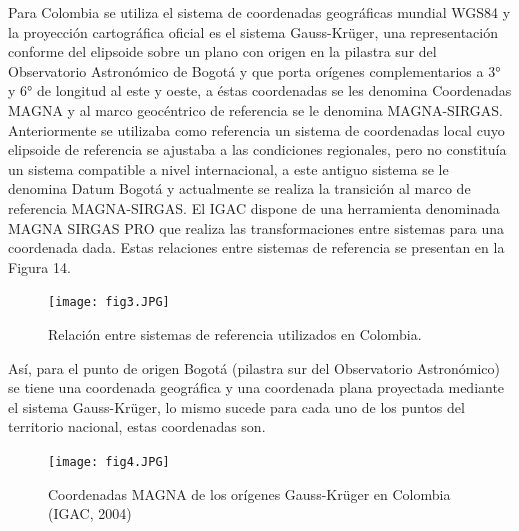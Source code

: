 \documentclass[12pt,hidelinks]{article}
\begin{document}
Para Colombia se utiliza el sistema de coordenadas geográficas mundial WGS84 y la proyección cartográfica oficial es el sistema Gauss-Krüger, una representación conforme del
elipsoide sobre un plano con origen en la pilastra sur del Observatorio Astronómico de Bogotá y que
porta orígenes complementarios a 3° y 6° de longitud al este y oeste, a éstas coordenadas se les denomina Coordenadas MAGNA y al marco geocéntrico de referencia se le denomina MAGNA-SIRGAS. Anteriormente se utilizaba como referencia un sistema de coordenadas local cuyo elipsoide de referencia se ajustaba a las condiciones regionales, pero no constituía un sistema compatible a nivel internacional, a este antiguo sistema se le denomina Datum Bogotá y actualmente se realiza
la transición al marco de referencia MAGNA-SIRGAS. El IGAC dispone de una herramienta
denominada MAGNA SIRGAS PRO que realiza las transformaciones entre sistemas para una
coordenada dada. Estas relaciones entre sistemas de referencia se presentan en la Figura 14.\\[0.05 in]
\begin{figure}[H]
    \centering
    \texttt{[image: fig3.JPG]}
    \caption{Relación entre sistemas de referencia utilizados en Colombia.}
    \label{fig:my_label}
\end{figure}
Así, para el punto de origen Bogotá (pilastra sur del Observatorio Astronómico) se tiene una
coordenada geográfica y una coordenada plana proyectada mediante el sistema Gauss-Krüger, lo
mismo sucede para cada uno de los puntos del territorio nacional, estas coordenadas son.
\begin{figure}[H]
    \centering
    \texttt{[image: fig4.JPG]}
    \caption{Coordenadas MAGNA de los orígenes Gauss-Krüger en Colombia (IGAC, 2004)}
    \label{fig:my_label}
\end{figure}
\end{document}
